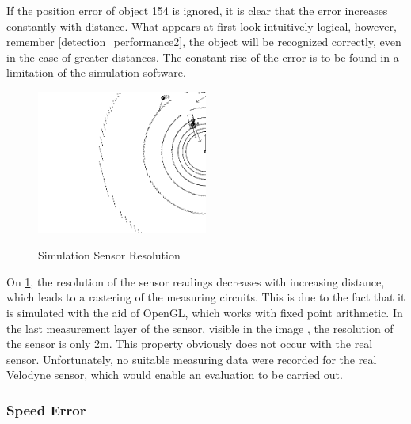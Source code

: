 \documentclass[11pt,oneside,openright]{mpreport}
\begin{document}
If the position error of object 154 is ignored, it is clear that the error increases constantly with distance. 
What appears at first look intuitively logical, however, remember \cref{detection_performance2}, the object will be recognized correctly, even in the case of greater distances.
The constant rise of the error is to be found in a limitation of the simulation software.

\begin{figure}[!htb]
  \caption{Simulation Sensor Resolution} 
  \centering
  \includegraphics[width=0.5\textwidth]{bilder/sen_err.png}
 \label{sen_res}
\end{figure}

On \cref{sen_res}, the resolution of the sensor readings decreases with increasing distance, which leads to a rastering of the measuring circuits. 
This is due to the fact that it is simulated with the aid of OpenGL, which works with fixed point arithmetic. In the last measurement layer of the sensor, visible in the image ,
the resolution of the sensor is only 2m.
This property obviously does not occur with the real sensor. Unfortunately, no suitable measuring data were recorded for the real Velodyne sensor, which would enable an evaluation to be carried out.

\subsubsection{Speed Error}
\end{document}
